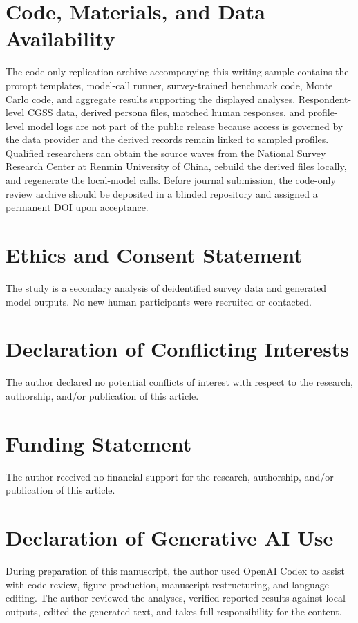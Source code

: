 \documentclass[10pt,twocolumn]{article}
\newcommand{\CGSS}{CGSS\xspace}
\begin{document}
\section*{Code, Materials, and Data Availability}

\begin{sloppypar}
The code-only replication archive accompanying this writing sample contains the prompt templates,
model-call runner, survey-trained benchmark code, Monte Carlo code, and aggregate results supporting
the displayed analyses. Respondent-level \CGSS data, derived persona files, matched human responses,
and profile-level model logs are not part of the public release because access is governed by the
data provider and the derived records remain linked to sampled profiles. Qualified researchers can
obtain the source waves from the National Survey Research Center at Renmin University of China,
rebuild the derived files locally, and regenerate the local-model calls. Before journal submission,
the code-only review archive should be deposited in a blinded repository and assigned a permanent
DOI upon acceptance.
\end{sloppypar}

\section*{Ethics and Consent Statement}

The study is a secondary analysis of deidentified survey data and generated model outputs. No new
human participants were recruited or contacted.

\section*{Declaration of Conflicting Interests}

The author declared no potential conflicts of interest with respect to the research, authorship,
and/or publication of this article.

\section*{Funding Statement}

The author received no financial support for the research, authorship, and/or publication of this
article.

\section*{Declaration of Generative AI Use}

During preparation of this manuscript, the author used OpenAI Codex to assist with code review,
figure production, manuscript restructuring, and language editing. The author reviewed the
analyses, verified reported results against local outputs, edited the generated text, and takes full
responsibility for the content.

\printbibliography[title={References}]
\end{document}
